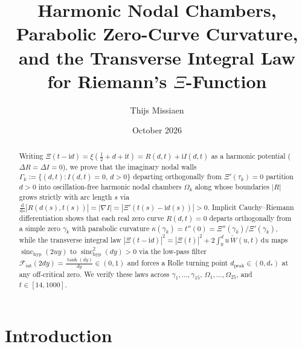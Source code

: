 \documentclass[11pt,a4paper,reqno]{amsart}
\title[Harmonic Nodal Chambers and Transverse Integral Law for $\Xi$]{Harmonic Nodal Chambers, Parabolic Zero-Curve Curvature, and the Transverse Integral Law for Riemann's $\Xi$-Function}
\author{Thijs Missiaen}
\date{October 2026}
\theoremstyle{definition}
\theoremstyle{remark}
\numberwithin{equation}{section}
\newcommand{\dd}{\mathrm{d}}
\newcommand{\ii}{\mathrm{i}}
\newcommand{\Wtil}{\widetilde{W}}
\newcommand{\sinch}{\operatorname{sinc}_{\mathrm{hyp}}}
\newcommand{\Fint}{\mathcal{F}_{\mathrm{int}}}
\begin{document}
\begin{abstract}
Writing $\Xi(t-\ii d) = \xi(\frac{1}{2}+d+\ii t) = R(d,t) + \ii I(d,t)$ as a harmonic potential ($\Delta R = \Delta I = 0$), we prove that the imaginary nodal walls $\Gamma_k := \{(d,t) : I(d,t) = 0,\, d > 0\}$ departing orthogonally from $\Xi'(\tau_k) = 0$ partition $d > 0$ into oscillation-free harmonic nodal chambers $\Omega_k$ along whose boundaries $|R|$ grows strictly with arc length $s$ via $\frac{\dd}{\dd s}|R(d(s),t(s))| = |\nabla I| = |\Xi'(t(s)-\ii d(s))| > 0$. Implicit Cauchy--Riemann differentiation shows that each real zero curve $R(d,t) = 0$ departs orthogonally from a simple zero $\gamma_k$ with parabolic curvature $\kappa(\gamma_k) = t''(0) = \Xi''(\gamma_k)/\Xi'(\gamma_k)$, while the transverse integral law $|\Xi(t-\ii d)|^2 = |\Xi(t)|^2 + 2\int_0^d u\,\Wtil(u,t)\,\dd u$ maps $\sinch(2u y)$ to $\sinch^2(d y) > 0$ via the low-pass filter $\Fint(2d y) = \frac{\tanh(d y)}{d y} \in (0,1)$ and forces a Rolle turning point $d_{\mathrm{peak}} \in (0,d_*)$ at any off-critical zero. We verify these laws across $\gamma_1, \dots, \gamma_{15}$, $\Omega_1, \dots, \Omega_{25}$, and $t \in [14, 1000]$.
\end{abstract}

\maketitle

\section{Introduction}\label{sec:intro}
\end{document}
